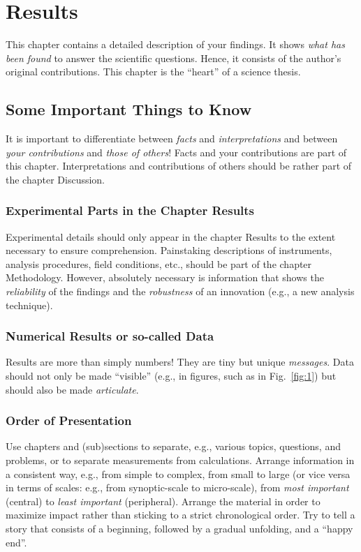 \chapter{Results}\label{chap3}
\thispagestyle{plain}

This chapter contains a detailed description of your findings. It shows
\emph{what has been found} to answer the scientific questions. Hence, it
consists of the author's original contributions. This chapter is the
``heart'' of a science thesis.


\section{Some Important Things to Know}\label{3sec:1}

It is important to differentiate between \emph{facts} and \emph{interpretations}
and between \emph{your contributions} and \emph{those of others}! Facts and
your contributions are part of this chapter. Interpretations and contributions
of others should be rather part of the chapter Discussion.


\subsection{Experimental Parts in the Chapter Results}
Experimental details should only appear in the chapter Results to the
extent necessary to ensure comprehension. Painstaking descriptions of
instruments, analysis procedures, field conditions, etc., should be part of the
chapter Methodology. However, absolutely necessary is information that shows
the \emph{reliability} of the findings and the \emph{robustness} of an
innovation (e.g., a new analysis technique).


\subsection{Numerical Results or so-called Data}
Results are more than simply numbers! They are tiny but unique
\emph{messages}. Data should not only be made ``visible'' (e.g., in
figures, such as in Fig.~\ref{fig:1}) but should also be made
\emph{articulate}.


\subsection{Order of Presentation}
Use chapters and (sub)sections to separate, e.g., various topics,
questions, and problems, or to separate measurements from calculations. 
Arrange information in a consistent way, e.g., from simple to complex, from
small to large (or vice versa in terms of scales: e.g., from
synoptic-scale to micro-scale), from \emph{most important} (central) to
\emph{least important} (peripheral). Arrange the material in order to maximize
impact rather than sticking to a strict chronological order. Try to tell a story
that consists of a beginning, followed by a gradual unfolding, and a
``happy end''.


